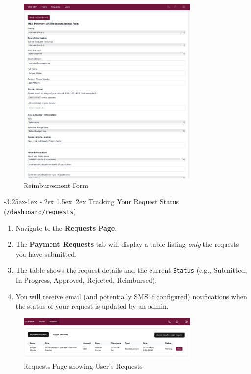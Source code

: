 \documentclass{article}
\makeatletter
\renewcommand \subsection{\@startsection{subsection}{2}{\z@}%
                                     {-3.25ex\@plus -1ex \@minus -.2ex}%
                                     {1.5ex \@plus .2ex}%
                                     {\normalfont\large\bfseries}}
\makeatother
\begin{document}
\begin{figure}[H]
    \centering
    \includegraphics[width=0.8\textwidth]{reimbursement_form.png}
    \caption{Reimbursement Form}
\end{figure}

\subsection{Tracking Your Request Status (\texttt{/dashboard/requests})}
\begin{enumerate}
    \item Navigate to the \textbf{Requests Page}.
    \item The \textbf{Payment Requests} tab will display a table listing \textit{only} the requests you have submitted.
    \item The table shows the request details and the current \texttt{Status} (e.g., Submitted, In Progress, Approved, Rejected, Reimbursed).
    \item You will receive email (and potentially SMS if configured) notifications when the status of your request is updated by an admin.
\end{enumerate}

\begin{figure}[H]
    \centering
    \includegraphics[width=0.8\textwidth]{current_user_requests.png}
    \caption{Requests Page showing User's Requests}
\end{figure}
\end{document}
